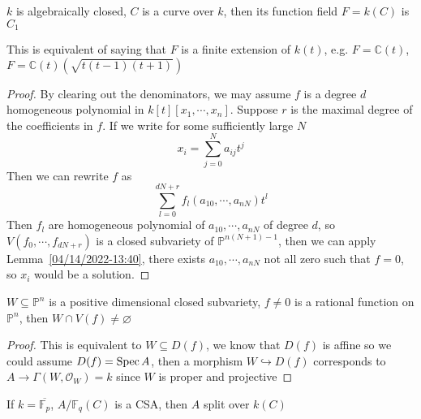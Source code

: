\documentclass[a4paper,10pt]{article}
\begin{document}
\begin{theorem}
$k$ is algebraically closed, $C$ is a curve over $k$, then its function field $F=k(C)$ is $C_1$
\end{theorem}

\begin{remark}
This is equivalent of saying that $F$ is a finite extension of $k(t)$, e.g. $F=\mathbb C(t)$, $F=\mathbb C(t)(\sqrt{t(t-1)(t+1)})$
\end{remark}

\begin{proof}
By clearing out the denominators, we may assume $f$ is a degree $d$ homogeneous polynomial in $k[t][x_1,\cdots,x_n]$. Suppose $r$ is the maximal degree of the coefficients in $f$. If we write for some sufficiently large $N$
\[
x_i=\sum_{j=0}^Na_{ij}t^j
\]
Then we can rewrite $f$ as
\[
\sum_{l=0}^{dN+r}f_l(a_{10},\cdots,a_{nN})t^l
\]
Then $f_l$ are homogeneous polynomial of $a_{10},\cdots,a_{nN}$ of degree $d$, so $V(f_0,\cdots,f_{dN+r})$ is a closed subvariety of $\mathbb P^{n(N+1)-1}$, then we can apply Lemma~\ref{04/14/2022-13:40}, there exists $a_{10},\cdots,a_{nN}$ not all zero such that $f=0$, so $x_i$ would be a solution.
\end{proof}

\begin{lemma}\label{04/14/2022-13:40}
$W\subseteq\mathbb P^n$ is a positive dimensional closed subvariety, $f\neq0$ is a rational function on $\mathbb P^n$, then $W\cap V(f)\neq\varnothing$
\end{lemma}

\begin{proof}
This is equivalent to $W\subseteq D(f)$, we know that $D(f)$ is affine so we could assume $D(f)=\operatorname{Spec} A$, then a morphism $W\hookrightarrow D(f)$ corresponds to $A\to\Gamma(W,\mathcal O_W)=k$ since $W$ is proper and projective
\end{proof}

\begin{remark}
If $k=\overline{\mathbb F_p}$, $A/\mathbb F_q(C)$ is a CSA, then $A$ split over $k(C)$
\end{remark}
\end{document}
